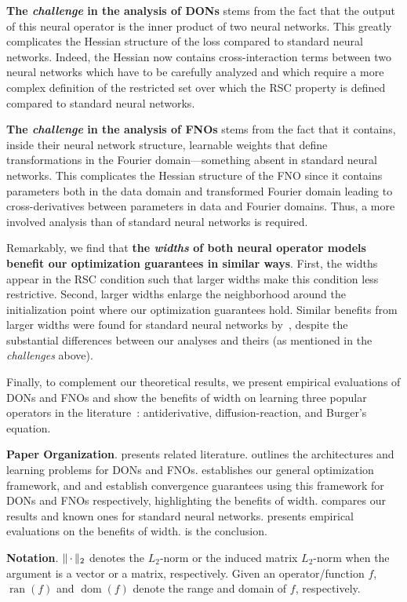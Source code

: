 \textbf{The \emph{challenge} in the analysis of DONs} stems from the fact that the output of this neural operator is the inner product of two neural networks. This greatly complicates the Hessian structure of the loss compared to standard neural networks. Indeed, the Hessian now contains cross-interaction terms between two neural networks which have to be carefully analyzed and which require a more complex definition of the restricted set over which the RSC property is defined compared to standard neural networks.  

\textbf{The \emph{challenge} in the analysis of FNOs} stems from the fact that it contains, inside their neural network structure, learnable weights that define transformations in the Fourier domain---something absent in standard neural networks. 
This complicates the Hessian structure of the FNO since it contains parameters both in the data domain and transformed Fourier domain leading to cross-derivatives between parameters in data and Fourier domains. 
Thus, a more involved analysis than of standard neural networks is required. 
%
%  

Remarkably, we find that \textbf{the \emph{widths} of both neural operator models benefit our optimization guarantees in similar ways}. First, the widths appear in the RSC condition such that larger widths make this condition less restrictive. Second, larger widths enlarge the neighborhood around the initialization point where our optimization guarantees hold. Similar benefits from larger widths were found for standard neural networks by~\citet{banerjee2022restricted}, despite the substantial differences between our analyses and theirs (as mentioned in the \emph{challenges} above). 
%
%

%

Finally, to complement our theoretical results, we present empirical evaluations of DONs and FNOs and show the benefits of width on learning three popular operators in the literature~\citep{li_fourier_2021,lu20201DeepONet}: antiderivative, diffusion-reaction, and Burger's equation. 

%
\textbf{Paper Organization}. 
 presents related literature. 
 outlines the architectures and learning problems for DONs and FNOs. 
 establishes our general optimization framework, and  and  establish convergence guarantees using this framework for DONs and FNOs respectively, highlighting the benefits of width.
 compares our results and known ones for standard neural networks. 
 presents empirical evaluations on the benefits of width. 
 is the conclusion.


\textbf{Notation}. $\lVert\,\cdot\,\rVert_2$ denotes the $L_2$-norm or the induced matrix $L_2$-norm when the argument is a vector or a matrix, respectively. Given an operator/function $f$, $\operatorname{ran}(f)$ and $\operatorname{dom}(f)$ denote the range and domain of $f$, respectively.
%
